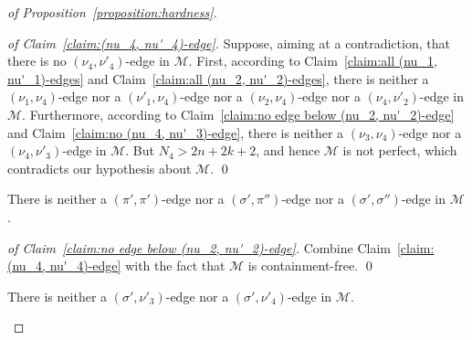 \begin{proof}[of Proposition~\ref{proposition:hardness}]
  \begin{proof}[of Claim~\ref{claim:(nu_4, nu'_4)-edge}]
    Suppose, aiming at a contradiction, that there is no
    $(\nu_4, \nu'_4)$-edge in $\mathcal{M}$.
    First, according to
    Claim~\ref{claim:all (nu_1, nu'_1)-edges} and
    Claim~\ref{claim:all (nu_2, nu'_2)-edges},
    there is neither a $(\nu_1, \nu_4)$-edge
    nor a $(\nu'_1, \nu_4)$-edge
    nor a $(\nu_2, \nu_4)$-edge
    nor a $(\nu_4, \nu'_2)$-edge in $\mathcal{M}$.
    Furthermore, according to
    Claim~\ref{claim:no edge below (nu_2, nu'_2)-edge} and
    Claim~\ref{claim:no (nu_4, nu'_3)-edge},
    there is neither a $(\nu_3, \nu_4)$-edge
    nor a $(\nu_4, \nu'_3)$-edge in $\mathcal{M}$.
    But $N_4 > 2n + 2k + 2$, and
    hence $\mathcal{M}$ is not perfect,
    which contradicts our hypothesis about $\mathcal{M}$.
    \qed
  \end{proof}

  \begin{claim}
    \label{claim:no edge below (nu_4, nu'_4)-edge}
    There is
    neither a $(\pi', \pi')$-edge
    nor a $(\sigma', \pi'')$-edge
    nor a $(\sigma', \sigma'')$-edge
    in $\mathcal{M}$.
  \end{claim}

  \begin{proof}[of Claim~\ref{claim:no edge below (nu_2, nu'_2)-edge}]
    Combine Claim~\ref{claim:(nu_4, nu'_4)-edge} with the
    fact that $\mathcal{M}$ is containment-free.
    \qed
  \end{proof}

  \begin{claim}
    \label{claim:no (sigma', nu'_3)-edge, no (sigma', nu'_4)-edge}
    There is neither a $(\sigma', \nu'_3)$-edge
    nor a $(\sigma', \nu'_4)$-edge in $\mathcal{M}$.
  \end{claim}


\end{proof}
